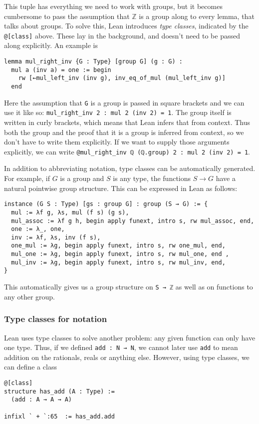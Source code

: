 \documentclass[a4paper, 12pt]{article}
\newcommand{\Z}{\mathbb{Z}}
\newcommand{\lean}[1]{\texttt{#1}}
\theoremstyle{changedot}
\theoremstyle{changedotbreak}
\theoremstyle{nonumberplain}
\begin{document}
This tuple has everything we need to work with groups, but it becomes cumbersome to pass the assumption that $\Z$ is a group along to every lemma, that talks about groups. To solve this, Lean introduces \textit{type classes}, indicated by the \lean{@[class]} above. These lay in the background, and doesn't need to be passed along explicitly. An example is
\begin{verbatim}
lemma mul_right_inv {G : Type} [group G] (g : G) :
  mul a (inv a) = one := begin
    rw [←mul_left_inv (inv g), inv_eq_of_mul (mul_left_inv g)]
  end
\end{verbatim}
Here the assumption that \lean{G} is a group is passed in square brackets and we can use it like so: \lean{mul_right_inv 2 : mul 2 (inv 2) = 1}. The group itself is written in curly brackets, which means that Lean infers that from context. Thus both the group and the proof that it is a group is inferred from context, so we don't have to write them explicitly. If we want to supply those arguments explicitly, we can write \lean{@mul_right_inv ℚ (ℚ.group) 2 : mul 2 (inv 2) = 1}.

In addition to abbreviating notation, type classes can be automatically generated. For example, if $G$ is a group and $S$ is any type, the functions $S \to G$ have a natural pointwise group structure. This can be expressed in Lean as follows:

\begin{verbatim}
instance (G S : Type) [gs : group G] : group (S → G) := {
  mul := λf g, λs, mul (f s) (g s),
  mul_assoc := λf g h, begin apply funext, intro s, rw mul_assoc, end,
  one := λ_, one,
  inv := λf, λs, inv (f s),
  one_mul := λg, begin apply funext, intro s, rw one_mul, end,
  mul_one := λg, begin apply funext, intro s, rw mul_one, end ,
  mul_inv := λg, begin apply funext, intro s, rw mul_inv, end,
}
\end{verbatim}

This automatically gives us a group structure on \lean{S → ℤ} as well as on functions to any other group. 

\subsubsection{Type classes for notation}
Lean uses type classes to solve another problem: any given function can only have one type. Thus, if we defined \lean{add : N → N}, we cannot later use \lean{add} to mean addition on the rationals, reals or anything else. However, using type classes, we can define a class
\begin{verbatim}
@[class]
structure has_add (A : Type) :=
  (add : A → A → A)

infixl ` + `:65  := has_add.add
\end{verbatim}
\end{document}

